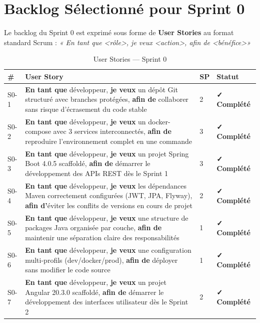 \documentclass[12pt,a4paper]{report}
\begin{document}
\section{Backlog Sélectionné pour Sprint 0}

Le backlog du Sprint 0 est exprimé sous forme de \textbf{User Stories} au format standard Scrum :
\textit{« En tant que \textless rôle\textgreater, je veux \textless action\textgreater, afin de \textless bénéfice\textgreater »}

\begin{table}[H]
\centering
\caption{User Stories — Sprint 0}
\begin{tabular}{|p{0.4cm}|p{7.5cm}|p{1.5cm}|p{3cm}|}
\hline
\textbf{\#} & \textbf{User Story} & \textbf{SP} & \textbf{Statut} \\
\hline
S0-1 & \textbf{En tant que} développeur, \textbf{je veux} un dépôt Git structuré avec branches protégées, \textbf{afin de} collaborer sans risque d'écrasement du code stable & 2 & \textbf{✓ Complété} \\
\hline
S0-2 & \textbf{En tant que} développeur, \textbf{je veux} un docker-compose avec 3 services interconnectés, \textbf{afin de} reproduire l'environnement complet en une commande & 3 & \textbf{✓ Complété} \\
\hline
S0-3 & \textbf{En tant que} développeur, \textbf{je veux} un projet Spring Boot 4.0.5 scaffoldé, \textbf{afin de} démarrer le développement des APIs REST dès le Sprint 1 & 3 & \textbf{✓ Complété} \\
\hline
S0-4 & \textbf{En tant que} développeur, \textbf{je veux} les dépendances Maven correctement configurées (JWT, JPA, Flyway), \textbf{afin d'}éviter les conflits de versions en cours de projet & 2 & \textbf{✓ Complété} \\
\hline
S0-5 & \textbf{En tant que} développeur, \textbf{je veux} une structure de packages Java organisée par couche, \textbf{afin de} maintenir une séparation claire des responsabilités & 1 & \textbf{✓ Complété} \\
\hline
S0-6 & \textbf{En tant que} développeur, \textbf{je veux} une configuration multi-profils (dev/docker/prod), \textbf{afin de} déployer sans modifier le code source & 1 & \textbf{✓ Complété} \\
\hline
S0-7 & \textbf{En tant que} développeur, \textbf{je veux} un projet Angular 20.3.0 scaffoldé, \textbf{afin de} démarrer le développement des interfaces utilisateur dès le Sprint 2 & 2 & \textbf{✓ Complété} \\

\end{tabular}
\end{table}
\end{document}
